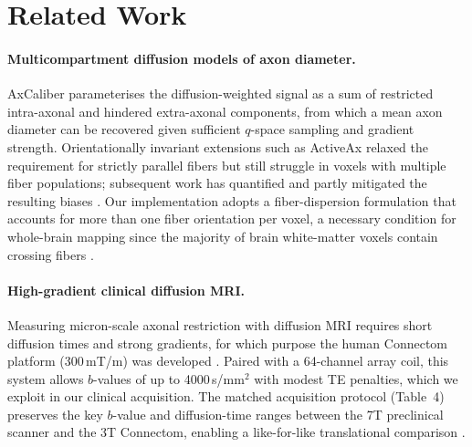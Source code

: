 \section{Related Work}

\paragraph{Multicompartment diffusion models of axon diameter.}
AxCaliber \cite{assaf2008axcaliber} parameterises the diffusion-weighted signal as a sum of restricted intra-axonal and hindered extra-axonal components, from which a mean axon diameter can be recovered given sufficient $q$-space sampling and gradient strength. Orientationally invariant extensions such as ActiveAx \cite{alexander2010orientationally} relaxed the requirement for strictly parallel fibers but still struggle in voxels with multiple fiber populations; subsequent work has quantified and partly mitigated the resulting biases \cite{sepehrband2016towards,desantis2019whole}. Our implementation adopts a fiber-dispersion formulation \cite{desantis2019whole,tax2014recursive} that accounts for more than one fiber orientation per voxel, a necessary condition for whole-brain mapping since the majority of brain white-matter voxels contain crossing fibers \cite{jeurissen2013investigating}.

\paragraph{High-gradient clinical diffusion MRI.}
Measuring micron-scale axonal restriction with diffusion MRI requires short diffusion times and strong gradients, for which purpose the human Connectom platform (300\,mT/m) was developed \cite{jones2018microstructural}. Paired with a 64-channel array coil, this system allows $b$-values of up to 4000\,s/mm$^2$ with modest TE penalties, which we exploit in our clinical acquisition. The matched acquisition protocol (Table~4) preserves the key $b$-value and diffusion-time ranges between the 7T preclinical scanner and the 3T Connectom, enabling a like-for-like translational comparison \cite{desantis2019whole}.


